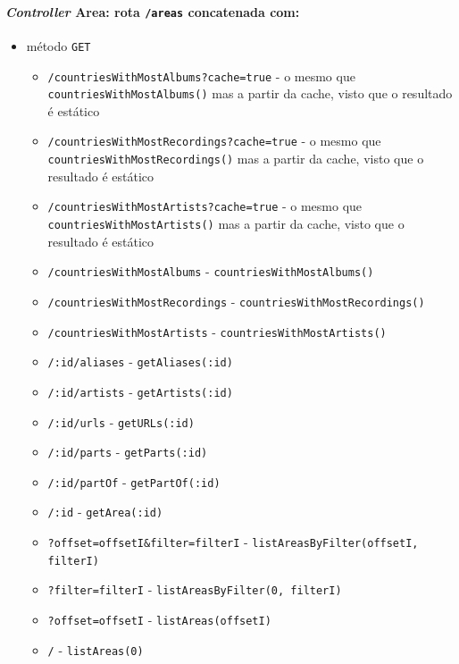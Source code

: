 \documentclass{article}
\begin{document}
\paragraph{\textit{Controller} Area: rota \texttt{/areas} concatenada com:}
    \begin{itemize}
        \item método \texttt{GET}
            \begin{itemize}
                \item \texttt{/countriesWithMostAlbums?cache=true} - o mesmo que \texttt{countriesWithMostAlbums()} mas a partir da cache, visto que o resultado é estático
                \item \texttt{/countriesWithMostRecordings?cache=true} - o mesmo que \texttt{countriesWithMostRecordings()} mas a partir da cache, visto que o resultado é estático
                \item \texttt{/countriesWithMostArtists?cache=true} - o mesmo que \texttt{countriesWithMostArtists()} mas a partir da cache, visto que o resultado é estático
                \item \texttt{/countriesWithMostAlbums} - \texttt{countriesWithMostAlbums()}
                \item \texttt{/countriesWithMostRecordings} - \texttt{countriesWithMostRecordings()}
                \item \texttt{/countriesWithMostArtists} - \texttt{countriesWithMostArtists()}
                \item \texttt{/:id/aliases} - \texttt{getAliases(:id)}
                \item \texttt{/:id/artists} - \texttt{getArtists(:id)}
                \item \texttt{/:id/urls} - \texttt{getURLs(:id)}
                \item \texttt{/:id/parts} - \texttt{getParts(:id)}
                \item \texttt{/:id/partOf} - \texttt{getPartOf(:id)}
                \item \texttt{/:id} - \texttt{getArea(:id)}
                \item \texttt{?offset=offsetI\&filter=filterI} - \texttt{listAreasByFilter(offsetI, filterI)}
                \item \texttt{?filter=filterI} - \texttt{listAreasByFilter(0, filterI)}
                \item \texttt{?offset=offsetI} - \texttt{listAreas(offsetI)}
                \item \texttt{/} - \texttt{listAreas(0)}
            \end{itemize}
    \end{itemize}
\end{document}

